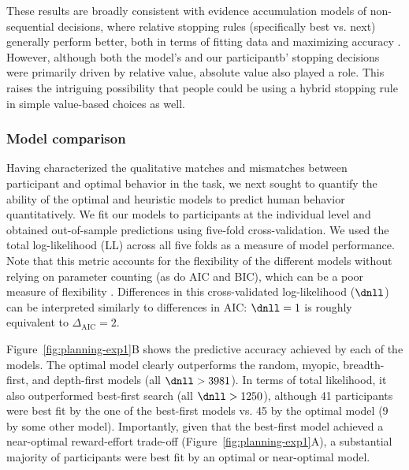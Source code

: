 These results are broadly consistent with evidence accumulation models of non-sequential decisions, where relative stopping rules (specifically best vs. next) generally perform better, both in terms of fitting data \citep{ratcliff2004comparison,teodorescu2013disentangling} and maximizing accuracy \citep{mcmillen2006dynamics,bogacz2006physics}. However, although both the model's and our participantb' stopping decisions were primarily driven by relative value, absolute value also played a role. This raises the intriguing possibility that people could be using a hybrid stopping rule in simple value-based choices as well.

\subsubsection{Model comparison}\label{sec:planning-comparison}
Having characterized the qualitative matches and mismatches between participant and optimal behavior in the task, we next sought to quantify the ability of the optimal and heuristic models to predict human behavior quantitatively.
%
We fit our models to participants at the individual level and obtained out-of-sample predictions using five-fold cross-validation. We used the total log-likelihood (LL) across all five folds as a measure of model performance. Note that this metric accounts for the flexibility of the different models without relying on parameter counting (as do AIC and BIC), which can be a poor measure of flexibility \citep{piantadosi2018one}. Differences in this cross-validated log-likelihood ($\dnll$) can be interpreted similarly to differences in AIC: $\dnll = 1$ is roughly equivalent to $\Delta_{\mathrm{AIC}} = 2$.

Figure~\ref{fig:planning-exp1}B shows the predictive accuracy achieved by each of the models. The optimal model clearly outperforms the random, myopic, breadth-first, and depth-first models (all $\dnll > 3981$). In terms of total likelihood, it also outperformed best-first search (all $\dnll > 1250$), although 41 participants were best fit by the one of the best-first models vs. 45 by the optimal model (9 by some other model). Importantly, given that the best-first model achieved a near-optimal reward-effort trade-off (Figure~\ref{fig:planning-exp1}A), a substantial majority of participants were best fit by an optimal or near-optimal model.
%



